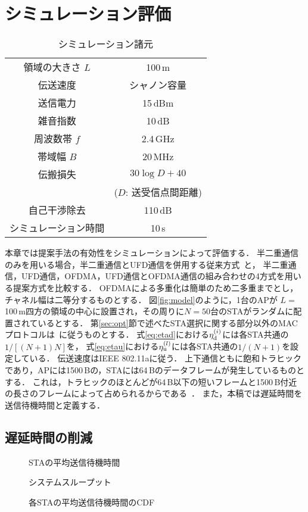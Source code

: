 \documentclass[technicalreport]{ieicej}
\begin{document}
\section{シミュレーション評価}

	\begin{table}[t]
		\centering
		\caption{シミュレーション諸元}
		\label{tab:param}
		\begin{tabular}{cc} \hline
			領域の大きさ $L$ & 100\,m \\
			伝送速度 & シャノン容量 \\
			送信電力 & 15\,dBm \\
			雑音指数 & 10\,dB \\
			周波数帯 $f$& 2.4\,GHz \\
			帯域幅 $B$ & 20\,MHz \\
			伝搬損失 & $30\log D + 40$\\
			&($D$: 送受信点間距離)\\
			自己干渉除去 & 110\,dB \\
			シミュレーション時間 & 10\,s \\\hline
		\end{tabular}
	\end{table}

	本章では提案手法の有効性をシミュレーションによって評価する．
	半二重通信のみを用いる場合，半二重通信とUFD通信を併用する従来方式~\cite{promac_fair}と，
	半二重通信，UFD通信，OFDMA，UFD通信とOFDMA通信の組み合わせの4方式を用いる提案方式を比較する．
	OFDMAによる多重化は簡単のため二多重までとし，チャネル幅は二等分するものとする．
	図\ref{fig:model}のように，1台のAPが $L=$100\,m四方の領域の中心に設置され，その周りに$N=50$台のSTAがランダムに配置されているとする．
	第\ref{sec:opt}節で述べたSTA選択に関する部分以外のMACプロトコルは~\cite{promac}に従うものとする．
	式\eqref{eq:etad}における$\eta_{\rm d}^{(i)}$には各STA共通の$1/[(N+1)N]$を，
	式\eqref{eq:etau}における$\eta_{\rm u}^{(l)}$には各STA共通の$1/(N+1)$を設定している．
	伝送速度はIEEE 802.11aに従う．
	上下通信ともに飽和トラヒックであり，APには1500\,Bの，STAには64\,Bのデータフレームが発生しているものとする．
	これは，トラヒックのほとんどが64\,B以下の短いフレームと1500\,B付近の長さのフレームによって占められるからである~\cite{traffic}．
	また，本稿では遅延時間を送信待機時間と定義する．

	\subsection{遅延時間の削減}
		\begin{figure}[t]
			\centering
			\caption{STAの平均送信待機時間}
			\label{fig:delay}
		\end{figure}
		\begin{figure}[t]
			\centering
			\caption{システムスループット}
			\label{fig:thr}
		\end{figure}
		\begin{figure}[t]
			\centering
			\caption{各STAの平均送信待機時間のCDF}
			\label{fig:cdf}
		\end{figure}
\end{document}
